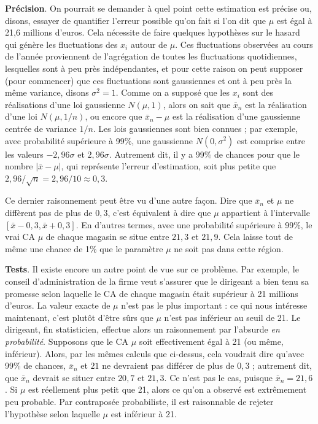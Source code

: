 \documentclass[
  10,
  letterpaper,
  DIV=11,
  numbers=noendperiod]{scrreport}
\theoremstyle{plain}
\theoremstyle{definition}
\theoremstyle{plain}
\theoremstyle{definition}
\theoremstyle{definition}
\theoremstyle{plain}
\theoremstyle{remark}
\begin{document}
\textbf{Précision}. On pourrait se demander à quel point cette
estimation est précise ou, disons, essayer de quantifier l'erreur
possible qu'on fait si l'on dit que \(\mu\) est égal à 21,6 millions
d'euros. Cela nécessite de faire quelques hypothèses sur le hasard qui
génère les fluctuations des \(x_i\) autour de \(\mu\). Ces fluctuations
observées au cours de l'année proviennent de l'agrégation de toutes les
fluctuations quotidiennes, lesquelles sont à peu près indépendantes, et
pour cette raison on peut supposer (pour commencer) que ces fluctuations
sont gaussiennes et ont à peu près la même variance, disons
\(\sigma^2=1\). Comme on a supposé que les \(x_i\) sont des réalisations
d'une loi gaussienne \(N(\mu, 1)\), alors on sait que \(\bar{x}_n\) est
la réalisation d'une loi \(N(\mu, 1/n)\), ou encore que
\(\bar{x}_n - \mu\) est la réalisation d'une gaussienne centrée de
variance \(1/n\). Les lois gaussiennes sont bien connues ; par exemple,
avec probabilité supérieure à 99\%, une gaussienne \(N(0, \sigma^2)\)
est comprise entre les valeurs \(-2,96\sigma\) et \(2,96\sigma\).
Autrement dit, il y a 99\% de chances pour que le nombre
\(|\bar{x}-\mu|\), qui représente l'erreur d'estimation, soit plus
petite que \(2,96/\sqrt{n} = 2,96/10 \approx 0,3\).

Ce dernier raisonnement peut être vu d'une autre façon. Dire que
\(\bar{x}_n\) et \(\mu\) ne diffèrent pas de plus de \(0,3\), c'est
équivalent à dire que \(\mu\) appartient à l'intervalle
\([\bar{x} - 0,3, \bar{x} +0,3]\). En d'autres termes, avec une
probabilité supérieure à 99\%, le vrai CA \(\mu\) de chaque magasin se
situe entre \(21,3\) et \(21,9\). Cela laisse tout de même une chance de
1\% que le paramètre \(\mu\) ne soit pas dans cette région.

\textbf{Tests}. Il existe encore un autre point de vue sur ce problème.
Par exemple, le conseil d'administration de la firme veut s'assurer que
le dirigeant a bien tenu sa promesse selon laquelle le CA de chaque
magasin était supérieur à 21 millions d'euros. La valeur exacte de
\(\mu\) n'est pas le plus important : ce qui nous intéresse maintenant,
c'est plutôt d'être sûrs que \(\mu\) n'est pas inférieur au seuil de 21.
Le dirigeant, fin statisticien, effectue alors un raisonnement par
l'absurde \emph{en probabilité}. Supposons que le CA \(\mu\) soit
effectivement égal à 21 (ou même, inférieur). Alors, par les mêmes
calculs que ci-dessus, cela voudrait dire qu'avec 99\% de chances,
\(\bar{x}_n\) et \(21\) ne devraient pas différer de plus de \(0,3\) ;
autrement dit, que \(\bar{x}_n\) devrait se situer entre \(20,7\) et
\(21,3\). Ce n'est pas le cas, puisque \(\bar{x}_n = 21,6\). Si \(\mu\)
est réellement plus petit que 21, alors ce qu'on a observé est
extrêmement peu probable. Par contraposée probabiliste, il est
raisonnable de rejeter l'hypothèse selon laquelle \(\mu\) est inférieur
à 21.
\end{document}
